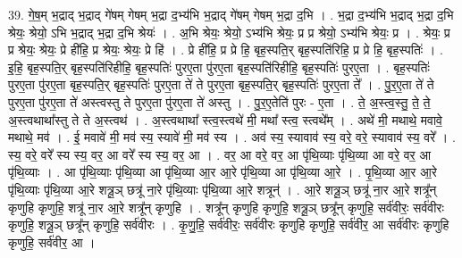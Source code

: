 \documentclass[17pt]{extarticle}
\begin{document}
39. गे॒ष॒म् भ॒द्राद् भ॒द्राद् गे॑षम् गेषम् भ॒द्रा द॒भ्य॑भि भ॒द्राद् गे॑षम् गेषम् भ॒द्रा द॒भि । . भ॒द्रा द॒भ्य॑भि भ॒द्राद् भ॒द्रा द॒भि श्रेयः॒ श्रेयो॒ ऽभि भ॒द्राद् भ॒द्रा द॒भि श्रेयः॑ । . अ॒भि श्रेयः॒ श्रेयो॒ ऽभ्य॑भि श्रेयः॒ प्र प्र श्रेयो॒ ऽभ्य॑भि श्रेयः॒ प्र । . श्रेयः॒ प्र प्र श्रेयः॒ श्रेयः॒ प्रे ही॑हि॒ प्र श्रेयः॒ श्रेयः॒ प्रे हि॑ । . प्रे ही॑हि॒ प्र प्रे हि॒ बृह॒स्पति॒र् बृह॒स्पति॑रिहि॒ प्र प्रे हि॒ बृह॒स्पतिः॑ । . इ॒हि॒ बृह॒स्पति॒र् बृह॒स्पति॑रिहीहि॒ बृह॒स्पतिः॑ पुरए॒ता पु॑रए॒ता बृह॒स्पति॑रिहीहि॒ बृह॒स्पतिः॑ पुरए॒ता । . बृह॒स्पतिः॑ पुरए॒ता पु॑रए॒ता बृह॒स्पति॒र् बृह॒स्पतिः॑ पुरए॒ता ते॑ ते पुरए॒ता बृह॒स्पति॒र् बृह॒स्पतिः॑ पुरए॒ता ते᳚ । . पु॒र॒ए॒ता ते॑ ते पुरए॒ता पु॑रए॒ता ते॑ अस्त्वस्तु ते पुरए॒ता पु॑रए॒ता ते॑ अस्तु । . पु॒र॒ए॒तेति॑ पुरः - ए॒ता । . ते॒ अ॒स्त्व॒स्तु॒ ते॒ ते॒ अ॒स्त्वथाथा᳚स्तु ते ते अ॒स्त्वथ॑ । . अ॒स्त्वथाथा᳚ स्त्व॒स्त्वथे॑ मी॒ मथा᳚ स्त्व॒ स्त्वथे᳚म् । . अथे॑ मी॒ मथाथे॒ मवावे॒ मथाथे॒ मव॑ । . ई॒ मवावे॑ मी॒ मव॑ स्य॒ स्यावे॑ मी॒ मव॑ स्य । . अव॑ स्य॒ स्यावाव॑ स्य॒ वरे॒ वरे॒ स्यावाव॑ स्य॒ वरे᳚ । . स्य॒ वरे॒ वरे᳚ स्य स्य॒ वर॒ आ वरे᳚ स्य स्य॒ वर॒ आ । . वर॒ आ वरे॒ वर॒ आ पृ॑थि॒व्याः पृ॑थि॒व्या आ वरे॒ वर॒ आ पृ॑थि॒व्याः । . आ पृ॑थि॒व्याः पृ॑थि॒व्या आ पृ॑थि॒व्या आ॒र आ॒रे पृ॑थि॒व्या आ पृ॑थि॒व्या आ॒रे । . पृ॒थि॒व्या आ॒र आ॒रे पृ॑थि॒व्याः पृ॑थि॒व्या आ॒रे शत्रू॒ञ् छत्रू॑ ना॒रे पृ॑थि॒व्याः पृ॑थि॒व्या आ॒रे शत्रून्॑ । . आ॒रे शत्रू॒ञ् छत्रू॑ ना॒र आ॒रे शत्रू᳚न् कृणुहि कृणुहि॒ शत्रू॑ ना॒र आ॒रे शत्रू᳚न् कृणुहि । . शत्रू᳚न् कृणुहि कृणुहि॒ शत्रू॒ञ् छत्रू᳚न् कृणुहि॒ सर्व॑वीरः॒ सर्व॑वीरः कृणुहि॒ शत्रू॒ञ् छत्रू᳚न् कृणुहि॒ सर्व॑वीरः । . कृ॒णु॒हि॒ सर्व॑वीरः॒ सर्व॑वीरः कृणुहि कृणुहि॒ सर्व॑वीर॒ आ सर्व॑वीरः कृणुहि कृणुहि॒ सर्व॑वीर॒ आ । \newline
\end{document}
